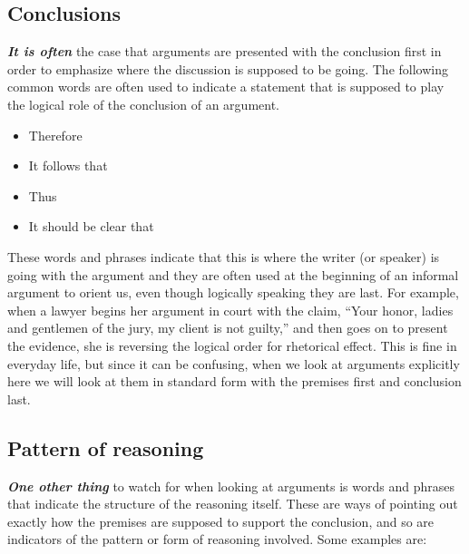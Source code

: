\documentclass[
  12pt, openany]{book}
\makeatletter
\providecommand{\tightlist}{%
  \setlength{\itemsep}{0pt}\setlength{\parskip}{0pt}}
\newenvironment{kframe}{%
\medskip{}
\setlength{\fboxsep}{.8em}
 \def\at@end@of@kframe{}%
 \ifinner\ifhmode%
  \def\at@end@of@kframe{\end{minipage}}%
  \begin{minipage}{\columnwidth}%
 \fi\fi%
 \def\FrameCommand##1{\hskip\@totalleftmargin \hskip-\fboxsep
 \colorbox{shadecolor}{##1}\hskip-\fboxsep
     \hskip-\linewidth \hskip-\@totalleftmargin \hskip\columnwidth}%
 \MakeFramed {\advance\hsize-\width
   \@totalleftmargin\z@ \linewidth\hsize
   \@setminipage}}%
 {\par\unskip\endMakeFramed%
 \at@end@of@kframe}
\newenvironment{rmdblock}[1]
  {
  \begin{itemize}
  \renewcommand{\labelitemi}{
    \raisebox{-.7\height}[0pt][0pt]{
      {\setkeys{Gin}{width=3em,keepaspectratio}\texttt{[image: img/\#1]}}
    }
  }
  \setlength{\fboxsep}{1em}
  \begin{kframe}
  \item
  }
  {
  \end{kframe}
  \end{itemize}
  }
\newenvironment{note}
  {\begin{rmdblock}{note}}
  {\end{rmdblock}}
\makeatother
\begin{document}
\hypertarget{conclusions}{%
\subsection*{Conclusions}\label{conclusions}}


\textbf{\emph{It is often}} the case that arguments are presented with the conclusion first in order to emphasize where the discussion is supposed to be going. The following common words are often used to indicate a statement that is supposed to play the logical role of the conclusion of an argument.

\begin{note}

\begin{itemize}
\tightlist
\item
  Therefore
\item
  It follows that
\item
  Thus
\item
  It should be clear that
\end{itemize}

\end{note}

These words and phrases indicate that this is where the writer (or speaker) is going with the argument and they are often used at the beginning of an informal argument to orient us, even though logically speaking they are last. For example, when a lawyer begins her argument in court with the claim, ``Your honor, ladies and gentlemen of the jury, my client is not guilty,'' and then goes on to present the evidence, she is reversing the logical order for rhetorical effect. This is fine in everyday life, but since it can be confusing, when we look at arguments explicitly here we will look at them in standard form with the premises first and conclusion last.

\hypertarget{pattern-of-reasoning}{%
\subsection*{Pattern of reasoning}\label{pattern-of-reasoning}}


\textbf{\emph{One other thing}} to watch for when looking at arguments is words and phrases that indicate the structure of the reasoning itself. These are ways of pointing out exactly how the premises are supposed to support the conclusion, and so are indicators of the pattern or form of reasoning involved. Some examples are:
\end{document}

